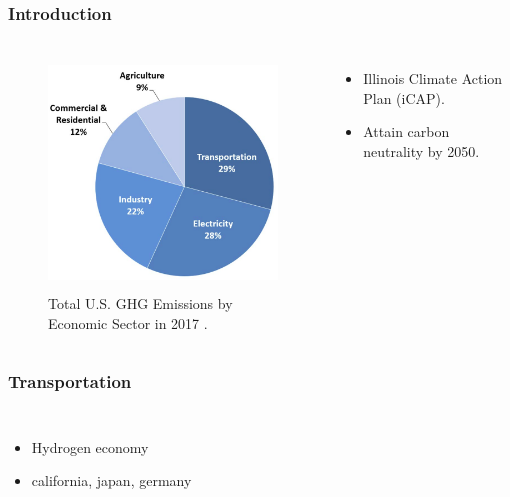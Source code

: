 \begin{frame}
\frametitle{Introduction}
\begin{columns}
    \column[t]{5cm}
	\begin{figure}[htbp!]
		\begin{center}
			\includegraphics[height=6.2cm]{images/total-ghg-2017.png}
		\end{center}
		\caption{Total U.S. GHG Emissions by Economic Sector in 2017 \cite{us_epa_sources_2020}.}
	\end{figure}

	\column[t]{5cm}
	\begin{itemize}
		\item Illinois Climate Action Plan (iCAP).
		\item Attain carbon neutrality by 2050.
	\end{itemize}
\end{columns}
\end{frame}


\begin{frame}
\frametitle{Transportation}
\begin{columns}
	\column[t]{5cm}
	\begin{itemize}
		\item Hydrogen economy
		\item california, japan, germany
	\end{itemize}

\end{columns}
\end{frame}

